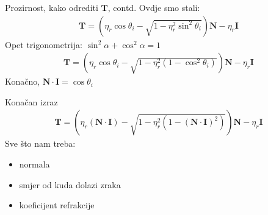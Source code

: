 \documentclass[9pt]{beamer}
\begin{document}
\begin{frame}{Prozirnost, kako odrediti $\mathbf{T}$, contd.}
	Ovdje smo stali:
	\begin{align*}
	\mathbf{T} = \left(\eta_r\cos\theta_i - \sqrt{1-\eta_r^2\sin^2\theta_i}\right)\mathbf{N} - \eta_r\mathbf{I} 
	\end{align*}
	Opet trigonometrija: $\sin^2 \alpha + \cos^2 \alpha= 1$
	\begin{align*}
	\mathbf{T} = \left(\eta_r\cos\theta_i - \sqrt{1-\eta_r^2(1-\cos^2\theta_i)}\right)\mathbf{N} - \eta_r\mathbf{I}
	\end{align*}
	Konačno, $\mathbf{N}\cdot \mathbf{I}= \cos\theta_i$
	
	\begin{block}{Konačan izraz}
		\begin{align*}
		\mathbf{T} = \left(\eta_r(\mathbf{N}\cdot \mathbf{I}) - \sqrt{1-\eta_r^2(1-(\mathbf{N}\cdot \mathbf{I})^2)}\right)\mathbf{N} - \eta_r\mathbf{I}
		\end{align*}
		Sve što nam treba:
		\begin{itemize}
			\item normala
			\item smjer od kuda dolazi zraka
			\item koeficijent refrakcije
		\end{itemize}
	\end{block}
\end{frame}
\end{document}
